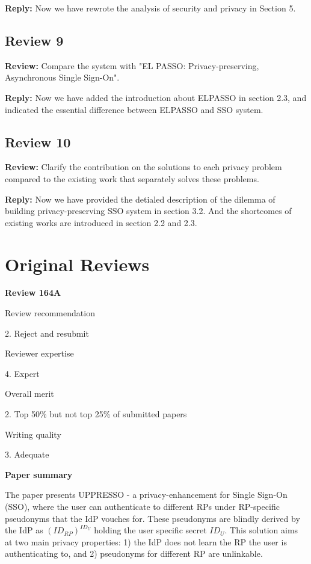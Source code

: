 \documentclass[letterpaper,onecolumn,10pt]{article}
\begin{document}
\vspace{1mm}\noindent\textbf{Reply:}
Now we have rewrote the analysis of security and privacy in Section 5.

\subsection*{Review 9}
\vspace{1mm}\noindent\textbf{Review:}
Compare the system with "EL PASSO: Privacy-preserving, Asynchronous Single Sign-On".

\vspace{1mm}\noindent\textbf{Reply:}
Now we have added the introduction about ELPASSO in section 2.3, and indicated the essential difference between ELPASSO and SSO system.  


\subsection*{Review 10}
\vspace{1mm}\noindent\textbf{Review:}
Clarify the contribution on the solutions to each privacy problem compared to the existing work that separately solves these problems.

\vspace{1mm}\noindent\textbf{Reply:}
Now we have provided the detialed description of the dilemma of building privacy-preserving SSO system in section 3.2. And the shortcomes of existing works are introduced in section 2.2 and 2.3.  


\newpage
\section*{Original Reviews}

\vspace{1mm}\noindent\textbf{Review 164A}


Review recommendation


2. Reject and resubmit

Reviewer expertise


4. Expert

Overall merit


2. Top 50\% but not top 25\% of submitted papers

Writing quality


3. Adequate

\vspace{1mm}\noindent\textbf{Paper summary}


The paper presents UPPRESSO - a privacy-enhancement for Single Sign-On (SSO), where the user can authenticate to different RPs under RP-specific pseudonyms that the IdP vouches for. These pseudonyms are blindly derived by the IdP as $(ID_{RP})^{ID_U}$ holding the user specific secret $ID_U$. This solution aims at two main privacy properties: 1) the IdP does not learn the RP the user is authenticating to, and 2) pseudonyms for different RP are unlinkable.
\end{document}
